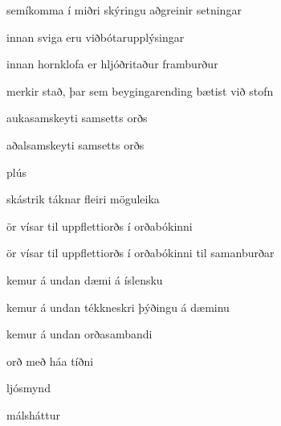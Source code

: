 \item[{;}] {semíkomma í miðri skýringu aðgreinir setningar}

\item[{(...)}] {innan sviga eru viðbótarupplýsingar}
\item[{[...]}] {innan hornklofa er hljóðritaður framburður}
\item[{|}] {merkir stað, þar sem beygingarending bætist við stofn}
\item[{·}] {aukasamskeyti samsetts orðs}
\item[{··}] {aðalsamskeyti samsetts orðs}
\item[{+}] {plús}
\item[{/}] {skástrik táknar fleiri möguleika}
\item[{\dicsymSee}] {ör vísar til uppflettiorðs í orðabókinni}
\item[{\dicsymCompare}] {ör vísar til uppflettiorðs í orðabókinni til samanburðar}
\item[{\dicsymExampleIS}] {kemur á undan dæmi á íslensku}
\item[{\dicsymExampleCS}] {kemur á undan tékkneskri þýðingu á dæminu}
\item[{\dicsymIdiom}] {kemur á undan orðasambandi}
\item[{\dicsymFrequent}] {orð með háa tíðni}

\item[{\dicsymPhoto}] {ljósmynd}
\item[{\dicsymProverb}] {málsháttur}
